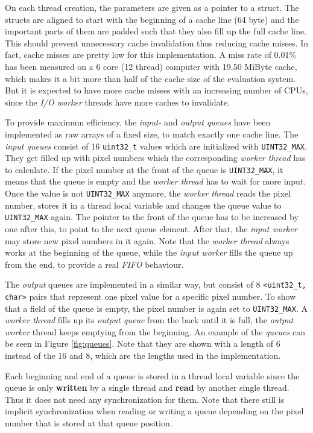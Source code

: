 On each thread creation, the parameters are given as a pointer to a struct. The structs are aligned to start with the beginning of a cache line (64 byte) and the important parts of them are padded such that they also fill up the full cache line. This should prevent unnecessary cache invalidation thus reducing cache misses. In fact, cache misses are pretty low for this implementation. A miss rate of 0.01\% has been measured on a 6 core (12 thread) computer with 19.50 MiByte cache, which makes it a bit more than half of the cache size of the evaluation system. But it is expected to have more cache misses with an increasing number of CPUs, since the \textit{I/O worker} threads have more caches to invalidate.

To provide maximum efficiency, the \textit{input-} and \textit{output queues} have been implemented as raw arrays of a fixed size, to match exactly one cache line. The \textit{input queues} consist of 16 \verb$uint32_t$ values which are initialized with \verb$UINT32_MAX$. They get filled up with pixel numbers which the corresponding \textit{worker thread} has to calculate. If the pixel number at the front of the queue is \verb$UINT32_MAX$, it means that the queue is empty and the \textit{worker thread} has to wait for more input. Once the value is not \verb$UINT32_MAX$ anymore, the \textit{worker thread} reads the pixel number, stores it in a thread local variable and changes the queue value to \verb$UINT32_MAX$ again. The pointer to the front of the queue has to be increased by one after this, to point to the next queue element. After that, the \textit{input worker} may store new pixel numbers in it again. Note that the \textit{worker thread} always works at the beginning of the queue, while the \textit{input worker} fills the queue up from the end, to provide a real \textit{FIFO} behaviour.

The \textit{output} queues are implemented in a similar way, but consist of 8 \verb$<uint32_t, char>$ pairs that represent one pixel value for a specific pixel number. To show that a field of the queue is empty, the pixel number is again set to \verb$UINT32_MAX$. A \textit{worker thread} fills up its \textit{output queue} from the back until it is full, the \textit{output worker} thread keeps emptying from the beginning. An example of the \textit{queues} can be seen in Figure \ref{fig:queues}. Note that they are shown with a length of 6 instead of the 16 and 8, which are the lengths used in the implementation.

Each beginning and end of a queue is stored in a thread local variable since the queue is only \textbf{written} by a single thread and \textbf{read} by another single thread. Thus it does not need any synchronization for them. Note that there still is implicit synchronization when reading or writing a queue depending on the pixel number that is stored at that queue position.

